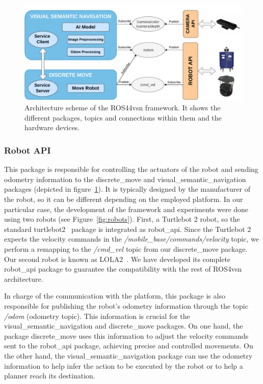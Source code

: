 \begin{figure}
    \centering
    \includegraphics[width=\linewidth]{figures/ros4vsn/arquitectura_paper}
    \caption{Architecture scheme of the ROS44\acrshort{vsn} framework.
    It shows the different packages, topics and connections within them and the hardware devices.}
    \label{fig:arch_scheme}
\end{figure}

\subsubsection{Robot API}\label{subsubsec:robot-api2}

This package is responsible for controlling the actuators of the robot and sending odometry information to the discrete\_move and visual\_semantic\_navi\-gation packages (depicted in figure~\ref{fig:arch_scheme}).
It is typically designed by the manufacturer of the robot, so it can be different depending on the employed platform.
In our particular case, the development of the framework and experiments were done using two robots (see Figure~\ref{fig:robots}).
First, a Turtlebot 2 robot, so the standard turtlebot2~\cite{kobuki} package is integrated as robot\_api.
Since the Turtlebot 2 expects the velocity commands in the \textit{/mobile\_base/commands/velocity} topic, we perform a remapping to the \textit{/cmd\_vel} topic from our discrete\_move package.
Our second robot is known as LOLA2~\cite{LOLA}.
We have developed its complete robot\_api package to guarantee the compatibility with the rest of ROS4\acrshort{vsn} architecture.

In charge of the communication with the platform, this package is also responsible for publishing the robot's odometry information through the topic \textit{/odom} (odometry topic).
This information is crucial for the visual\_seman\-tic\_navigation and discrete\_move packages.
On one hand, the package discrete\_move uses this information to adjust the velocity commands sent to the robot\_api package, achieving precise and controlled movements.
On the other hand, the visual\_semantic\_navigation package can use the odometry information to help infer the action to be executed by the robot or to help a planner reach its destination.

